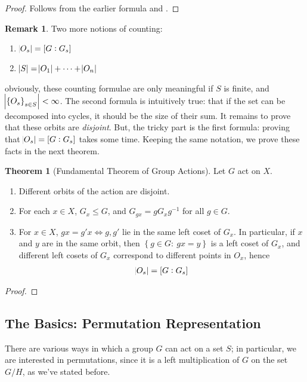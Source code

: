 \documentclass[11pt]{amsart} %
\theoremstyle{definition}
\newtheorem{theorem}[definition]{Theorem}
\theoremstyle{definition}
\newtheorem{remark}[definition]{Remark}
\numberwithin{equation}{section}
\newcommand{\condset}[4]{\left\{ #1  : \: #2 #3 #4 \right\}}
\begin{document}
\begin{proof}
	Follows from the earlier formula and .
\end{proof}

\begin{remark}
	Two more notions of counting:
	\begin{enumerate}
		\item $\abs{O_s} = [G : G_s]$
		\item $\abs{S} = \abs{O_1} + \dots + \abs{O_n}$
	\end{enumerate}
	obviously, these counting formulae are only meaningful if $S$ is finite, and $\abs{\set{O_s}_{s\in S}} < \infty$. The second formula is intuitively true: that if the set can be decomposed into cycles, it should be the size of their sum. It remains to prove that these orbits are \textit{disjoint}. But, the tricky part is the first formula: proving that $\abs{O_s} = [G : G_s]$ takes some time. Keeping the same notation, we prove these facts in the next theorem.
\end{remark}

\begin{theorem}[Fundamental Theorem of Group Actions]
	\label{thmpropertiesoforbitstab}
	Let $G$ act on $X$.
	\begin{enumerate}
		\item Different orbits of the action are disjoint.
		\item For each $x \in X$, $G_x \leq G $, and $G_{gx} = g G_x g^{-1}$ for all $g \in G$.
		\item For $x \in X$, $gx = g'x \iff g,g'$ lie in the same left coset of $G_x$. In particular, if $x$ and $y$ are in the same orbit, then $\condset{g \in G}{gx}{=}{y}$ is a left coset of $G_x$, and different left cosets of $G_x$ correspond to different points in $O_x$, hence
		\begin{align*}
			\abs{O_s} = [G : G_s]
		\end{align*}
	\end{enumerate}
\end{theorem}


\begin{proof}
	
\end{proof}






\subsection{The Basics: Permutation Representation}
There are various ways in which a group $G$ can act on a set $S$; in particular, we are interested in permutations, since it is a left multiplication of $G$ on the set $G/H$, as we've stated before.
\end{document}
